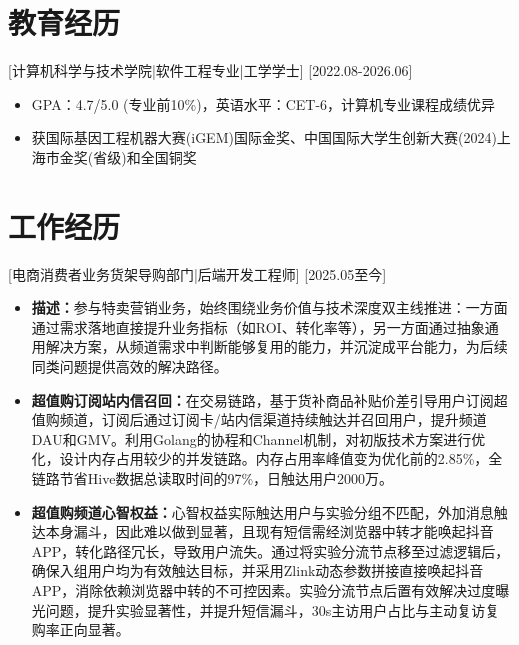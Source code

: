 \documentclass{style/template}
\begin{document}

\ResumeTitle

\section{教育经历}

[\textnormal{计算机科学与技术学院|软件工程专业|}工学学士]
[2022.08-2026.06]
\begin{itemize}
    \item GPA：4.7/5.0 (专业前10\%)，英语水平：CET-6，计算机专业课程成绩优异
    \item 获国际基因工程机器大赛(iGEM)国际金奖、中国国际大学生创新大赛(2024)上海市金奖(省级)和全国铜奖
\end{itemize}

\section{工作经历}

[\textnormal{电商消费者业务货架导购部门|}后端开发工程师]
[2025.05至今]
\begin{itemize}
    \item \textbf{描述：}参与特卖营销业务，始终围绕业务价值与技术深度双主线推进：一方面通过需求落地直接提升业务指标（如ROI、转化率等），另一方面通过抽象通用解决方案，从频道需求中判断能够复用的能力，并沉淀成平台能力，为后续同类问题提供高效的解决路径。
    \item \textbf{超值购订阅站内信召回：}在交易链路，基于货补商品补贴价差引导用户订阅超值购频道，订阅后通过订阅卡/站内信渠道持续触达并召回用户，提升频道DAU和GMV。利用Golang的协程和Channel机制，对初版技术方案进行优化，设计内存占用较少的并发链路。内存占用率峰值变为优化前的2.85\%，全链路节省Hive数据总读取时间的97\%，日触达用户2000万。
    \item \textbf{超值购频道心智权益：}心智权益实际触达用户与实验分组不匹配，外加消息触达本身漏斗，因此难以做到显著，且现有短信需经浏览器中转才能唤起抖音APP，转化路径冗长，导致用户流失。通过将实验分流节点移至过滤逻辑后，确保入组用户均为有效触达目标，并采用Zlink动态参数拼接直接唤起抖音APP，消除依赖浏览器中转的不可控因素。实验分流节点后置有效解决过度曝光问题，提升实验显著性，并提升短信漏斗，30s主访用户占比与主动复访复购率正向显著。
\end{itemize}
\end{document}
